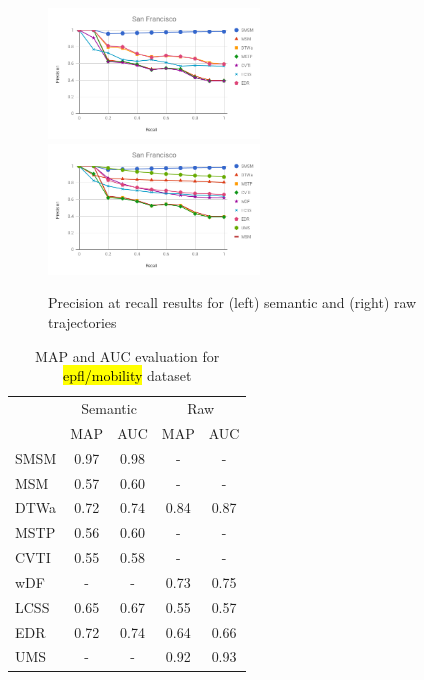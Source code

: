 \documentclass[12pt]{article}
\begin{document}
\begin{figure}[ht!]
\centering
\centerline{
\includegraphics[width=0.5\textwidth]{Images/P_R-chart_San_Francisco.png}
\includegraphics[width=0.5\textwidth]{Images/P_R-chart_San_Francisco-raw.png}
}
\caption{Precision at recall results for (left) semantic and (right) raw trajectories}
\label{fig:sanfrancisco_precision_recall}
\end{figure}

\begin{table}[h]
\scriptsize
  \centering
  \begin{tabular}{|l|c|c|c|c|}
  	\hline
 & \multicolumn{2}{c}{Semantic} & \multicolumn{2}{|c|}{Raw} \\
 	\cline{2-5}
 & MAP & AUC & MAP & AUC \\
  	\hline
SMSM & 0.97 & 0.98& - & -\\
MSM & 0.57 & 0.60 & - & -\\
DTWa & 0.72 & 0.74 & 0.84 & 0.87\\
MSTP & 0.56 & 0.60 & - & -\\
CVTI & 0.55 & 0.58 & - & -\\
 wDF & - & - & 0.73 & 0.75\\
LCSS & 0.65 & 0.67 & 0.55 & 0.57\\
 EDR & 0.72 & 0.74 & 0.64 & 0.66\\
UMS & - & - & 0.92 & 0.93 \\
    \hline
  \end{tabular}
  \caption{MAP and AUC evaluation for \hl{epfl/mobility} dataset}
  \label{tab:sanfrancisco_measures_map_auc}
\end{table}
\end{document}
